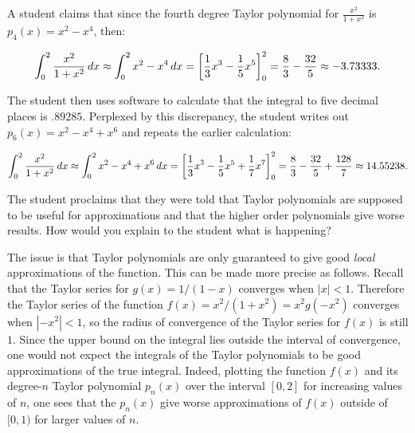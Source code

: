 \documentclass[]{ximera}
\begin{document}
\begin{problem} 
A student claims that since the fourth degree Taylor polynomial for $\frac{x^2}{1+x^2}$ is $p_4(x) = x^2-x^4$, then:

\[\int_0^2 \frac{x^2}{1+x^2} \mathop{}\!d x \approx \int_0^2 x^2-x^4 \mathop{}\!d x = \bigg[ \frac{1}{3}x^3-\frac{1}{5}x^5 \bigg]_0^2 = \frac{8}{3}-\frac{32}{5} \approx -3.73333.\]

The student then uses software to calculate that the integral to five decimal places is $.89285$.  Perplexed by this discrepancy, the student writes out $p_6(x) = x^2-x^4+x^6$  and repeats the earlier calculation:

\[\int_0^2 \frac{x^2}{1+x^2} \mathop{}\!d x \approx \int_0^2 x^2-x^4+x^6 \mathop{}\!d x = \bigg[ \frac{1}{3}x^3-\frac{1}{5}x^5+\frac{1}{7}x^7 \bigg]_0^2 = \frac{8}{3}-\frac{32}{5} +\frac{128}{7} \approx 14.55238.\]

The student proclaims that they were told that Taylor polynomials are supposed to be useful for approximations and that the higher order polynomials give worse results.  How would you explain to the student what is happening?

\begin{solution}
The issue is that Taylor polynomials are only guaranteed to give good \emph{local} approximations of the function. This can be made more precise as follows. Recall that the Taylor series for $g(x)=1/(1-x)$ converges when $|x|<1$. Therefore the Taylor series of the function $f(x)=x^2/(1+x^2) = x^2 g(-x^2)$ converges when $|-x^2| <1$, so the radius of convergence of the Taylor series for $f(x)$ is still $1$. Since the upper bound on the integral lies outside the interval of convergence, one would not expect the integrals of the Taylor polynomials to be good approximations of the true integral. Indeed, plotting the function $f(x)$ and its degree-$n$ Taylor polynomial $p_n(x)$ over the interval $[0,2]$ for increasing values of $n$, one sees that the $p_n(x)$ give worse approximations of $f(x)$ outside of $[0,1)$ for larger values of $n$.
\end{solution}
\end{problem}
\end{document}
